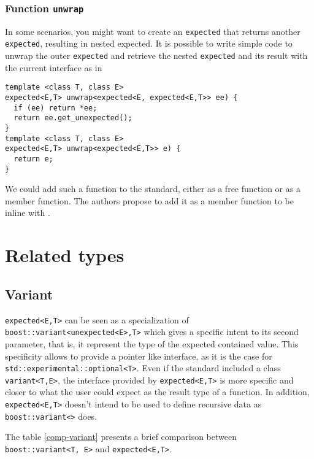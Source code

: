 \documentclass[a4paper,10pt]{article}
\newcommand{\cpp}[1]{\lstinline{#1}}
\begin{document}
\subsubsection{Function \cpp{unwrap}}

In some scenarios, you might want to create an \cpp{expected} that returns another \cpp{expected}, resulting in nested expected. 
It is possible to write simple code to unwrap the outer \cpp{expected} and retrieve the nested \cpp{expected} and its result with the current interface as in

\begin{lstlisting}
template <class T, class E>
expected<E,T> unwrap<expected<E, expected<E,T>> ee) {
  if (ee) return *ee;
  return ee.get_unexpected();
}
template <class T, class E>
expected<E,T> unwrap<expected<E,T>> e) {
  return e;
}
\end{lstlisting}

We could add such a function to the standard, either as a free function or as a member function. The authors propose to add it as a member function to be inline with \cite{ImprovementsAsync}.

\section{Related types}

\subsection{Variant}

\cpp{expected<E,T>} can be seen as a specialization of  \cpp{boost::variant<unexpected<E>,T>} which gives a specific intent to its second parameter, that is, it represent the type of the expected contained value. This specificity allows to provide a pointer like interface, as it is the case for \cpp{std::experimental::optional<T>}. Even if the standard included a class  \cpp{variant<T,E>}, the interface provided by \cpp{expected<E,T>} is more specific and closer to what the user could expect as the result type of a function. In addition, \cpp{expected<E,T>} doesn't intend to be used to define recursive data as \cpp{boost::variant<>} does.

The table \ref{comp-variant} presents a brief comparison between \cpp{boost::variant<T, E>} and \cpp{expected<E,T>}.
\end{document}
